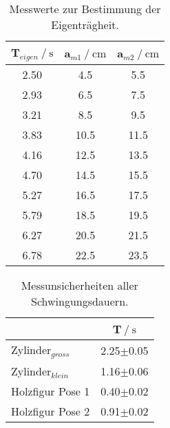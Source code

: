 \begin{table}
    \centering
    \caption{Messwerte zur Bestimmung der Eigenträgheit.}
    \label{tab:messEigen}
    \begin{tabular}{c c c}
        \toprule
        {T$_{eigen}\:/\:\si{\second}$} & {a$_{m1}\:/\:\si{\centi\meter}$} & {a$_{m2}\:/\:\si{\centi\meter}$} \\
        \midrule
        2.50 & 4.5  & 5.5  \\
        2.93 & 6.5  & 7.5  \\
        3.21 & 8.5  & 9.5  \\
        3.83 & 10.5 & 11.5 \\
        4.16 & 12.5 & 13.5 \\
        4.70 & 14.5 & 15.5 \\
        5.27 & 16.5 & 17.5 \\
        5.79 & 18.5 & 19.5 \\
        6.27 & 20.5 & 21.5 \\
        6.78 & 22.5 & 23.5 \\
        \bottomrule
    \end{tabular}
\end{table}

\begin{table}
    \centering
    \caption{Messunsicherheiten aller Schwingungsdauern.}
    \label{tab:mittelSchwing}
    \begin{tabular}{l c}
        \toprule
        & {T$\:/\:\si{\second}$} \\     %
        \midrule
        Zylinder$_{gross}$  & 2.25$\pm$0.05 \\
        Zylinder$_{klein}$  & 1.16$\pm$0.06 \\
        Holzfigur Pose 1    & 0.40$\pm$0.02 \\
        Holzfigur Pose 2    & 0.91$\pm$0.02 \\
        \bottomrule
    \end{tabular}
\end{table}